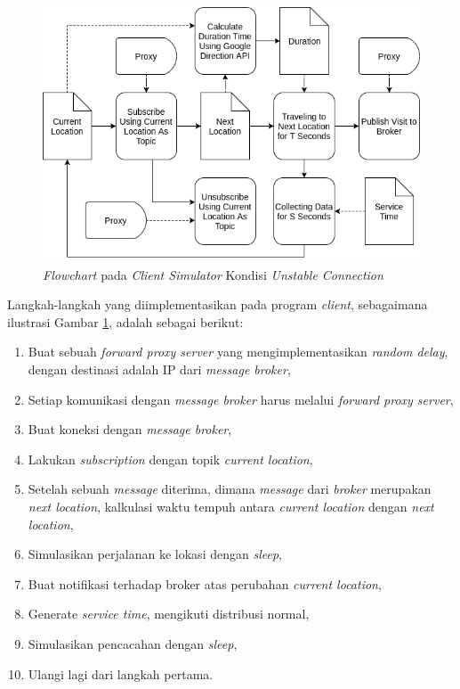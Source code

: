 \begin{figure}[h]
    \centering
    \includegraphics[width=\textwidth]{../../Resources/Images/client-algorithm-unstable-connection-field}
    \caption{\textit{Flowchart} pada \textit{Client Simulator} Kondisi \textit{Unstable Connection}}
    \label{fig:client-algorithm-unstable-connection-field}
\end{figure}


Langkah-langkah yang diimplementasikan pada program \textit{client}, sebagaimana ilustrasi Gambar \ref{fig:client-algorithm-unstable-connection-field}, adalah sebagai berikut:

\begin{enumerate}
\item Buat sebuah \textit{forward proxy server} yang mengimplementasikan \textit{random delay}, dengan destinasi adalah IP dari \textit{message broker}, 
\item Setiap komunikasi dengan \textit{message broker} harus melalui \textit{forward proxy server}, 
\item Buat koneksi dengan \textit{message broker}, 
\item Lakukan \textit{subscription} dengan topik \textit{current location}, 
\item Setelah sebuah \textit{message} diterima, dimana \textit{message} dari \textit{broker} merupakan \textit{next location}, kalkulasi waktu tempuh antara \textit{current location} dengan \textit{next location},
\item Simulasikan perjalanan ke lokasi dengan \textit{sleep},
\item Buat notifikasi terhadap broker atas perubahan \textit{current location}, 
\item Generate \textit{service time}, mengikuti distribusi normal, 
\item Simulasikan pencacahan dengan \textit{sleep}, 
\item Ulangi lagi dari langkah pertama.
\end{enumerate}


